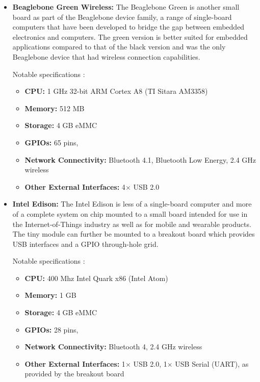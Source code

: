\begin{itemize}
        \item \textbf{Beaglebone Green Wireless:}
          The Beaglebone Green is another small board as part of the Beaglebone device family, a range of single-board computers that have been developed to bridge the gap between embedded electronics and computers. The green version is better suited for embedded applications compared to that of the black version and was the only Beaglebone device that had wireless connection capabilities.
          
          Notable specifications \cite{mouserbeaglebone_2016}:
          \begin{itemize}
            \item \textbf{CPU:} 1 GHz 32-bit ARM Cortex A8 (TI Sitara AM3358)
            \item \textbf{Memory:} 512 MB
            \item \textbf{Storage:} 4 GB eMMC
            \item \textbf{GPIOs:} 65 pins, 
            \item \textbf{Network Connectivity:} Bluetooth 4.1, Bluetooth Low Energy, 2.4 GHz wireless
            \item \textbf{Other External Interfaces:} 4$\times$ USB 2.0
          \end{itemize}
          
        \item \textbf{Intel Edison:}
          The Intel Edison is less of a single-board computer and more of a complete system on chip mounted to a small board intended for use in the Internet-of-Things industry as well as for mobile and wearable products. The tiny module can further be mounted to a breakout board which provides USB interfaces and a GPIO through-hole grid.

          Notable specifications \cite{intelEdison_2016}:
          \begin{itemize}
            \item \textbf{CPU:} 400 Mhz Intel Quark x86 (Intel Atom)
            \item \textbf{Memory:} 1 GB
            \item \textbf{Storage:} 4 GB eMMC
            \item \textbf{GPIOs:} 28 pins, 
            \item \textbf{Network Connectivity:} Bluetooth 4, 2.4 GHz wireless
            \item \textbf{Other External Interfaces:} 1$\times$ USB 2.0, 1$\times$ USB Serial (UART), as provided by the breakout board
          \end{itemize}
 

\end{itemize}

